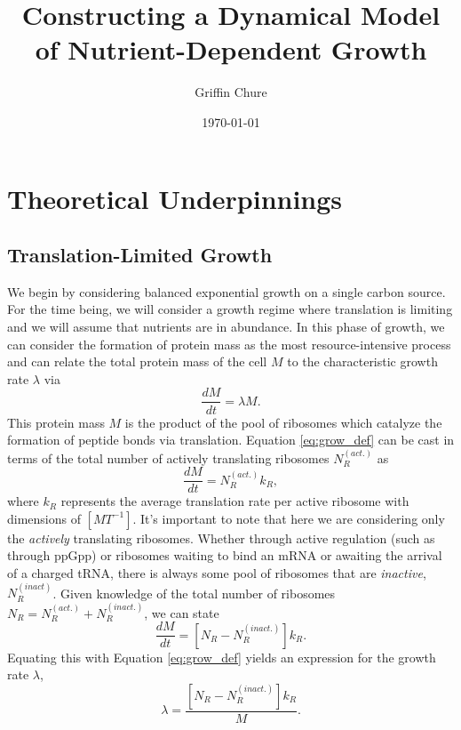 \documentclass[letterpaper, 11pt]{article}
\title{Constructing a Dynamical Model of Nutrient-Dependent Growth}
\author{Griffin Chure}
\date{\today}
\begin{document}
\maketitle

\section{Theoretical Underpinnings}
\subsection{Translation-Limited Growth}\label{sec:translation_limited_growth}
We begin by considering balanced exponential growth on a single carbon source.
For the time being, we will consider a growth regime where translation is
limiting and we will assume that nutrients are in abundance.  
In this phase of growth, we can consider the formation of protein mass
as the most resource-intensive process and can relate the total 
protein mass of the cell $M$ to the characteristic growth rate $\lambda$ via 
\begin{equation}\label{eq:grow_def}
\frac{dM}{dt} = \lambda M.
\end{equation}
This protein mass $M$ is the product of the pool of ribosomes which catalyze the
formation of peptide bonds via translation. Equation \eqref{eq:grow_def} can be 
cast in terms of the total number of actively translating ribosomes $N_R^{(act.)}$
as 
\begin{equation}
\frac{dM}{dt} = N_R^{(act.)}k_R,
\end{equation}
where $k_R$ represents the average translation rate per active ribosome with
dimensions of $[MT^{-1}]$. It's important to note that here we are considering
only  the \textit{actively} translating ribosomes. Whether through active
regulation (such as through ppGpp) or ribosomes waiting to bind an mRNA or 
awaiting the arrival of a charged tRNA, there is always some pool of ribosomes 
that are \textit{inactive}, $N_R^{(inact)}$. Given knowledge of the total number
of ribosomes $N_R = N_R^{(act.)} + N_R^{(inact.)}$, we can state 
\begin{equation}
    \frac{dM}{dt} = \left[N_R - N_R^{(inact.)}\right] k_R.
    \label{eq:growth_Nr}
\end{equation}
Equating this with Equation \eqref{eq:grow_def} yields an expression for the
growth rate $\lambda$,
\begin{equation}
\lambda = \frac{\left[N_R - N_R^{(inact.)}\right]k_R}{M}.
\label{eq:lam_nr}
\end{equation}
\end{document}
